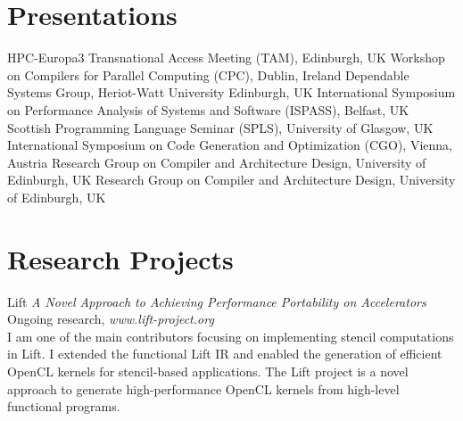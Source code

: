 \documentclass[11pt,a4paper,sans]{moderncv}        %
\begin{document}
\section{Presentations}
					{}{}{}{}
                    {HPC-Europa3 Transnational Access Meeting (TAM), Edinburgh, UK}
					{}{}{}{}
                    {Workshop on Compilers for Parallel Computing (CPC), Dublin, Ireland}
					{}{}{}{}
                    {Dependable Systems Group, Heriot-Watt University Edinburgh, UK}
					{}{}{}{}
                    {International Symposium on Performance Analysis of Systems and Software (ISPASS), Belfast, UK}
					{}{}{}{}
                    {Scottish Programming Language Seminar (SPLS), University of Glasgow, UK}
					{}{}{}{}
                    {International Symposium on Code Generation and Optimization (CGO), Vienna, Austria}
					{}{}{}{}
					{Research Group on Compiler and Architecture Design, University of Edinburgh, UK}
					{}{}{}{}
					{Research Group on Compiler and Architecture Design, University of Edinburgh, UK}


\section{Research Projects}
    \cventry{}
                    {}{}{}{}{}


					{Lift}
					{\textit{A Novel Approach to Achieving Performance Portability on Accelerators}}{}{}
					{Ongoing research, \textit{www.lift-project.org}\\
					 I am one of the main contributors focusing on implementing stencil computations in Lift.
					 I extended the functional Lift IR and enabled the generation
					 of efficient OpenCL kernels for stencil-based applications.
					 The Lift project is a novel approach to generate high-performance OpenCL kernels
					 from high-level functional programs.\\
					}
\end{document}
